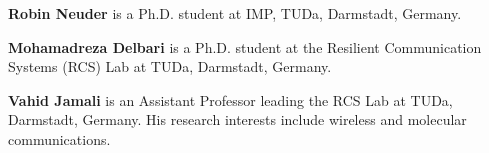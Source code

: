 \documentclass[journal]{IEEEtran}
\newcommand{\ara}[1]{{\color{red}AA: #1}}
\newcommand{\vahid}[1]{{\color{DarkGreen}VJ: #1}}
\begin{document}
\vspace{0.3cm}
\noindent 
\textbf{Robin Neuder} is a Ph.D. student at IMP, TUDa, Darmstadt, Germany.

\vspace{0.3cm}
\noindent 
\textbf{Mohamadreza Delbari} is a Ph.D. student at the Resilient Communication Systems (RCS) Lab at TUDa, Darmstadt, Germany.

\vspace{0.3cm}
\noindent 
\textbf{Vahid Jamali} is an Assistant Professor leading the RCS Lab at TUDa, Darmstadt, Germany. His research interests include wireless and molecular communications.











\end{document}
